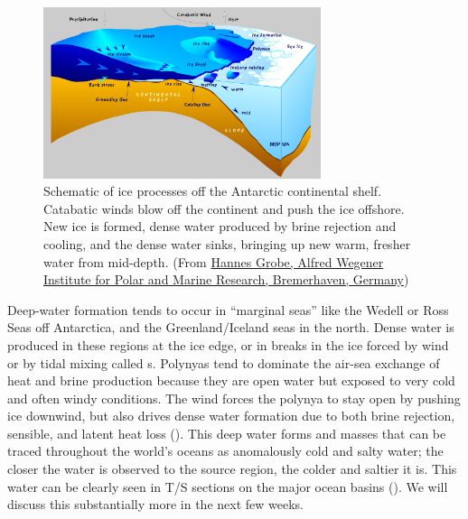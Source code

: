 \begin{figure}
       \includegraphics[width=3.2in]{figs/Antarctic_shelf_ice_hg} 
       \caption{Schematic of ice processes off the Antarctic continental shelf.  Catabatic winds blow off the continent and push the ice offshore.  New ice is formed, dense water produced by brine rejection and cooling, and the dense water sinks, bringing up new warm, fresher water from mid-depth. (From \href{https://en.wikipedia.org/wiki/Polynya}{Hannes Grobe, Alfred Wegener Institute for Polar and Marine Research, Bremerhaven, Germany})}
       \label{fig:AntarcticShelf}
\end{figure}

Deep-water formation tends to occur in ``marginal seas'' like the Wedell or Ross Seas off Antarctica, and the Greenland/Iceland seas in the north.  Dense water is produced in these regions at the ice edge, or in breaks in the ice forced by wind or by tidal mixing called s. Polynyas tend to dominate the air-sea exchange of heat and brine production because they are open water but exposed to very cold and often windy conditions.  The wind forces the polynya to stay open by pushing ice downwind, but also drives dense water formation due to both brine rejection, sensible, and latent heat loss ().  This deep water forms  and  masses that can be traced throughout the world's oceans as anomalously cold and salty water;  the closer the water is observed to the source region, the colder and saltier it is.  This water can be clearly seen in T/S sections on the major ocean basins (). We will discuss this substantially more in the next few weeks. 


